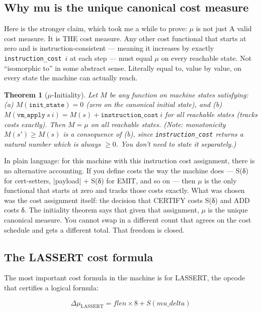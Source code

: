 \documentclass[11pt,a4paper]{article}
\theoremstyle{plain}
\newtheorem{theorem}{Theorem}[section]
\theoremstyle{definition}
\theoremstyle{remark}
\begin{document}
\subsection{Why mu is the unique canonical cost measure}

Here is the stronger claim, which took me a while to prove: $\mu$ is not just A valid cost measure. It is THE cost measure. Any other cost functional that starts at zero and is instruction-consistent --- meaning it increases by exactly \texttt{instruction\_cost}~$i$ at each step --- must equal $\mu$ on every reachable state. Not ``isomorphic to'' in some abstract sense. Literally equal to, value by value, on every state the machine can actually reach.

\begin{theorem}[$\mu$-Initiality]
\label{thm:initiality}
Let $M$ be any function on machine states satisfying: (a) $M(\texttt{init\_state}) = 0$ (zero on the canonical initial state), and (b) $M(\texttt{vm\_apply}\ s\ i) = M(s) + \texttt{instruction\_cost}\ i$ for all reachable states (tracks costs exactly). Then $M = \mu$ on all reachable states. (Note: monotonicity $M(s') \geq M(s)$ is a consequence of (b), since \texttt{instruction\_cost} returns a natural number which is always $\geq 0$. You don't need to state it separately.)
\end{theorem}

In plain language: for this machine with this instruction cost assignment, there is no alternative accounting. If you define costs the way the machine does --- S(δ) for cert-setters, |payload| + S(δ) for EMIT, and so on --- then $\mu$ is the only functional that starts at zero and tracks those costs exactly. What was chosen was the cost assignment itself: the decision that CERTIFY costs S(δ) and ADD costs δ. The initiality theorem says that given that assignment, $\mu$ is the unique canonical measure. You cannot swap in a different count that agrees on the cost schedule and gets a different total. That freedom is closed.

\subsection{The LASSERT cost formula}

The most important cost formula in the machine is for LASSERT, the opcode that certifies a logical formula:

\[
\Delta\mu_{\text{LASSERT}} = \mathit{flen} \times 8 + S(\mathit{mu\_delta})
\]
\end{document}
